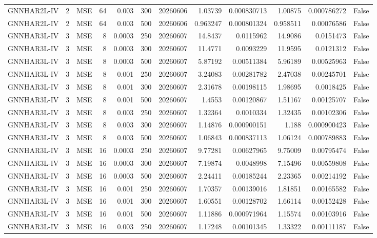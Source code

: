 \begin{tabular}{lrlrrrrrrrrr}
GNNHAR2L-IV & 2 & MSE & 64 & 0.003 & 300 & 20260606 & 1.03739 & 0.000830713 & 1.00875 & 0.000786272 & False \\
GNNHAR2L-IV & 2 & MSE & 64 & 0.003 & 500 & 20260606 & 0.963247 & 0.000801324 & 0.958511 & 0.00076586 & False \\
GNNHAR3L-IV & 3 & MSE & 8 & 0.0003 & 250 & 20260607 & 14.8437 & 0.0115962 & 14.9086 & 0.0151473 & False \\
GNNHAR3L-IV & 3 & MSE & 8 & 0.0003 & 300 & 20260607 & 11.4771 & 0.0093229 & 11.9595 & 0.0121312 & False \\
GNNHAR3L-IV & 3 & MSE & 8 & 0.0003 & 500 & 20260607 & 5.87192 & 0.00511384 & 5.96189 & 0.00525963 & False \\
GNNHAR3L-IV & 3 & MSE & 8 & 0.001 & 250 & 20260607 & 3.24083 & 0.00281782 & 2.47038 & 0.00245701 & False \\
GNNHAR3L-IV & 3 & MSE & 8 & 0.001 & 300 & 20260607 & 2.31678 & 0.00198115 & 1.98695 & 0.0018425 & False \\
GNNHAR3L-IV & 3 & MSE & 8 & 0.001 & 500 & 20260607 & 1.4553 & 0.00120867 & 1.51167 & 0.00125707 & False \\
GNNHAR3L-IV & 3 & MSE & 8 & 0.003 & 250 & 20260607 & 1.32364 & 0.0010334 & 1.32435 & 0.00102306 & False \\
GNNHAR3L-IV & 3 & MSE & 8 & 0.003 & 300 & 20260607 & 1.14876 & 0.000900151 & 1.188 & 0.000900423 & False \\
GNNHAR3L-IV & 3 & MSE & 8 & 0.003 & 500 & 20260607 & 1.06843 & 0.000837113 & 1.06124 & 0.000789883 & False \\
GNNHAR3L-IV & 3 & MSE & 16 & 0.0003 & 250 & 20260607 & 9.77281 & 0.00627965 & 9.75009 & 0.00795474 & False \\
GNNHAR3L-IV & 3 & MSE & 16 & 0.0003 & 300 & 20260607 & 7.19874 & 0.0048998 & 7.15496 & 0.00559808 & False \\
GNNHAR3L-IV & 3 & MSE & 16 & 0.0003 & 500 & 20260607 & 2.24411 & 0.00185244 & 2.23365 & 0.00214192 & False \\
GNNHAR3L-IV & 3 & MSE & 16 & 0.001 & 250 & 20260607 & 1.70357 & 0.00139016 & 1.81851 & 0.00165582 & False \\
GNNHAR3L-IV & 3 & MSE & 16 & 0.001 & 300 & 20260607 & 1.60551 & 0.00128702 & 1.66114 & 0.00152428 & False \\
GNNHAR3L-IV & 3 & MSE & 16 & 0.001 & 500 & 20260607 & 1.11886 & 0.000971964 & 1.15574 & 0.00103916 & False \\
GNNHAR3L-IV & 3 & MSE & 16 & 0.003 & 250 & 20260607 & 1.17248 & 0.00101345 & 1.33322 & 0.00111187 & False \\

\end{tabular}
